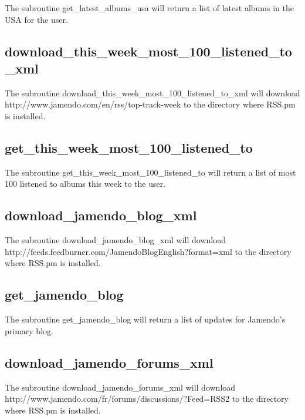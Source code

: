 The subroutine get\_latest\_albums\_usa will return a list of latest albums in the USA for the user.

\subsection*{download\_this\_week\_most\_100\_listened\_to\_xml\label{download_this_week_most_100_listened_to_xml}}


The subroutine download\_this\_week\_most\_100\_listened\_to\_xml will download http://www.jamendo.com/en/rss/top-track-week
to the directory where RSS.pm is installed.

\subsection*{get\_this\_week\_most\_100\_listened\_to\label{get_this_week_most_100_listened_to}}


The subroutine get\_this\_week\_most\_100\_listened\_to will return a list of most 100 listened to albums this week to the user.

\subsection*{download\_jamendo\_blog\_xml\label{download_jamendo_blog_xml}}


The subroutine download\_jamendo\_blog\_xml will download http://feeds.feedburner.com/JamendoBlogEnglish?format=xml
to the directory where RSS.pm is installed.

\subsection*{get\_jamendo\_blog\label{get_jamendo_blog}}


The subroutine get\_jamendo\_blog will return a list of updates for Jamendo's primary blog.

\subsection*{download\_jamendo\_forums\_xml\label{download_jamendo_forums_xml}}


The subroutine download\_jamendo\_forums\_xml will download http://www.jamendo.com/fr/forums/discussions/?Feed=RSS2
to the directory where RSS.pm is installed.

